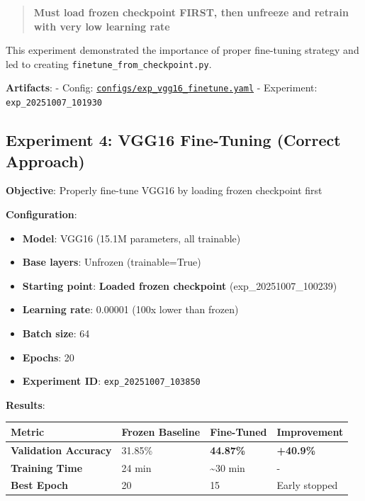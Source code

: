 \documentclass[
  letterpaper,
  DIV=11,
  numbers=noendperiod]{scrartcl}
\providecommand{\tightlist}{%
  \setlength{\itemsep}{0pt}\setlength{\parskip}{0pt}}
\begin{document}
\begin{quote}
\textbf{Must load frozen checkpoint FIRST, then unfreeze and retrain
with very low learning rate}
\end{quote}

This experiment demonstrated the importance of proper fine-tuning
strategy and led to creating \texttt{finetune\_from\_checkpoint.py}.

\textbf{Artifacts}: - Config:
\href{../configs/exp_vgg16_finetune.yaml}{\texttt{configs/exp\_vgg16\_finetune.yaml}}
- Experiment: \texttt{exp\_20251007\_101930}

\subsection{Experiment 4: VGG16 Fine-Tuning (Correct
Approach)}\label{experiment-4-vgg16-fine-tuning-correct-approach}

\textbf{Objective}: Properly fine-tune VGG16 by loading frozen
checkpoint first

\textbf{Configuration}:

\begin{itemize}
\tightlist
\item
  \textbf{Model}: VGG16 (15.1M parameters, all trainable)
\item
  \textbf{Base layers}: Unfrozen (trainable=True)
\item
  \textbf{Starting point}: \textbf{Loaded frozen checkpoint}
  (exp\_20251007\_100239)
\item
  \textbf{Learning rate}: 0.00001 (100x lower than frozen)
\item
  \textbf{Batch size}: 64
\item
  \textbf{Epochs}: 20
\item
  \textbf{Experiment ID}: \texttt{exp\_20251007\_103850}
\end{itemize}

\textbf{Results}:

\begin{longtable}[]{@{}llll@{}}
\toprule\noalign{}
Metric & Frozen Baseline & Fine-Tuned & Improvement \\
\midrule\noalign{}
\endhead
\bottomrule\noalign{}
\endlastfoot
\textbf{Validation Accuracy} & 31.85\% & \textbf{44.87\%} &
\textbf{+40.9\%} \\
\textbf{Training Time} & 24 min & \textasciitilde30 min & - \\
\textbf{Best Epoch} & 20 & 15 & Early stopped \\
\end{longtable}
\end{document}
